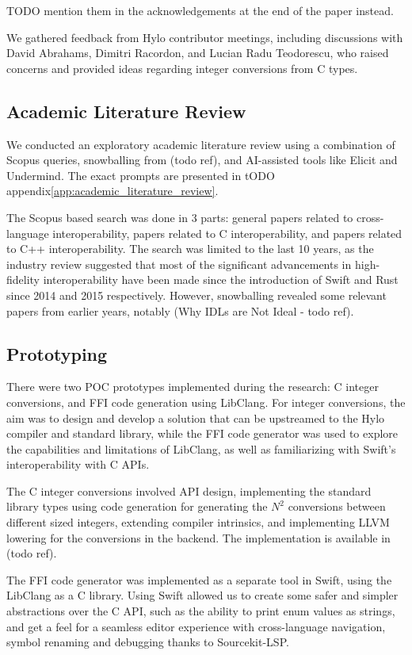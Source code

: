 TODO mention them in the acknowledgements at the end of the paper instead.

We gathered feedback from Hylo contributor meetings, including discussions with David Abrahams, Dimitri Racordon, and Lucian Radu Teodorescu, who raised concerns and provided ideas regarding integer conversions from C types.

\subsection{Academic Literature Review}
We conducted an exploratory academic literature review using a combination of Scopus queries, snowballing from (todo ref), and AI-assisted tools like Elicit and Undermind. The exact prompts are presented in tODO appendix\autoref{app:academic_literature_review}.

The Scopus based search was done in 3 parts: general papers related to cross-language interoperability, papers related to C interoperability, and papers related to C++ interoperability. The search was limited to the last 10 years, as the industry review suggested that most of the significant advancements in high-fidelity interoperability have been made since the introduction of Swift and Rust since 2014 and 2015 respectively. However, snowballing revealed some relevant papers from earlier years, notably (Why IDLs are Not Ideal - todo ref).

\subsection{Prototyping}
There were two POC prototypes implemented during the research: C integer conversions, and FFI code generation using LibClang. For integer conversions, the aim was to design and develop a solution that can be upstreamed to the Hylo compiler and standard library, while the FFI code generator was used to explore the capabilities and limitations of LibClang, as well as familiarizing with Swift's interoperability with C APIs.

The C integer conversions involved API design, implementing the standard library types using code generation for generating the $N^2$ conversions between different sized integers, extending compiler intrinsics, and implementing LLVM lowering for the conversions in the backend. The implementation is available in (todo ref).

The FFI code generator was implemented as a separate tool in Swift, using the LibClang as a C library. Using Swift allowed us to create some safer and simpler abstractions over the C API, such as the ability to print enum values as strings, and get a feel for a seamless editor experience with cross-language navigation, symbol renaming and debugging thanks to Sourcekit-LSP.

